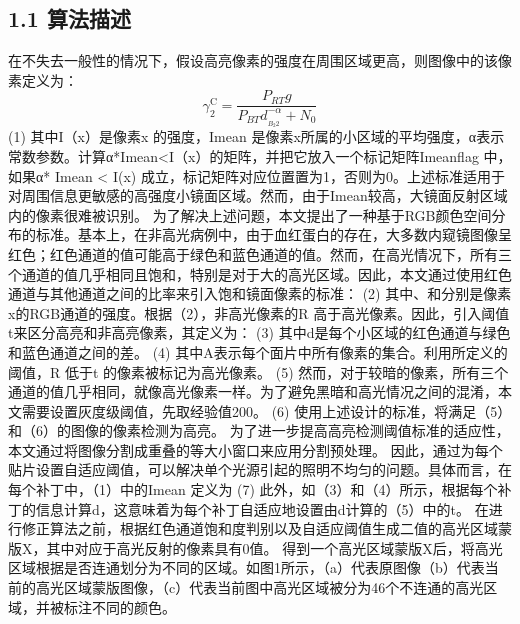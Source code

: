 \documentclass[UTF8,a4paper,12pt]{ctexart}
\begin{document}
\subsection{1.1  算法描述}
在不失去一般性的情况下，假设高亮像素的强度在周围区域更高，则图像中的该像素定义为：\begin{equation}\label{eq}
  \gamma _2^{\text{C}} = \frac{{{P_{RT}}g}}{{{P_{BT}}d_{_{{B_2}2}}^{ - \alpha } + {N_0}}}
\end{equation} (1)
其中I（x）是像素x 的强度，Imean 是像素x所属的小区域的平均强度，α表示常数参数。计算α*Imean<I（x）的矩阵，并把它放入一个标记矩阵Imeanflag 中，如果α* Imean < I(x) 成立，标记矩阵对应位置置为1，否则为0。上述标准适用于对周围信息更敏感的高强度小镜面区域。然而，由于Imean较高，大镜面反射区域内的像素很难被识别。
为了解决上述问题，本文提出了一种基于RGB颜色空间分布的标准。基本上，在非高光病例中，由于血红蛋白的存在，大多数内窥镜图像呈红色；红色通道的值可能高于绿色和蓝色通道的值。然而，在高光情况下，所有三个通道的值几乎相同且饱和，特别是对于大的高光区域。因此，本文通过使用红色通道与其他通道之间的比率来引入饱和镜面像素的标准：
                                (2)
其中、和分别是像素x的RGB通道的强度。根据（2），非高光像素的R 高于高光像素。因此，引入阈值t来区分高亮和非高亮像素，其定义为：
                               (3)
其中d是每个小区域的红色通道与绿色和蓝色通道之间的差。
                      (4)
其中A表示每个面片中所有像素的集合。利用所定义的阈值，R 低于t 的像素被标记为高光像素。
                                        (5)
然而，对于较暗的像素，所有三个通道的值几乎相同，就像高光像素一样。为了避免黑暗和高光情况之间的混淆，本文需要设置灰度级阈值，先取经验值200。
                                     (6)
使用上述设计的标准，将满足（5）和（6）的图像的像素检测为高亮。
为了进一步提高高亮检测阈值标准的适应性，本文通过将图像分割成重叠的等大小窗口来应用分割预处理。
因此，通过为每个贴片设置自适应阈值，可以解决单个光源引起的照明不均匀的问题。具体而言，在每个补丁中，（1）中的Imean 定义为
                              (7)
此外，如（3）和（4）所示，根据每个补丁的信息计算d，这意味着为每个补丁自适应地设置由d计算的（5）中的t。
在进行修正算法之前，根据红色通道饱和度判别以及自适应阈值生成二值的高光区域蒙版X，其中对应于高光反射的像素具有0值。
得到一个高光区域蒙版X后，将高光区域根据是否连通划分为不同的区域。如图1所示，（a）代表原图像（b）代表当前的高光区域蒙版图像，（c）代表当前图中高光区域被分为46个不连通的高光区域，并被标注不同的颜色。
\begin{figure}[H]   %
\centering
{}
  \hspace{0cm}      %
\centering
{}
\caption{}\label{fig}
\end{figure}
\end{document}
